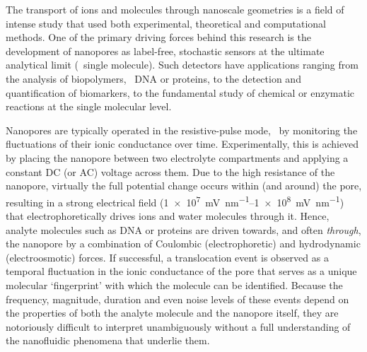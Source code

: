 \documentclass[journal=ancac3,manuscript=article,etalmode=truncate,maxauthors=0,layout=onecolumn]{achemso}
\begin{document}
The transport of ions and molecules through nanoscale geometries is a field of intense study that used both
experimental, theoretical and computational methods.\cite{Sparreboom-2010,Bocquet-2010,Maffeo-2012,
Thomas-2014,Wang-2014,Kim-2015} One of the primary driving forces behind this research is the development of
nanopores as label-free, stochastic sensors at the ultimate analytical limit (\ie{}~single molecule).
\cite{Bayley-2001,Dekker-2007,Venkatesan-2011,Zhang-2016} Such detectors have applications ranging from
the analysis of biopolymers,
\ie{}~DNA\cite{Deamer-2016,Kasianowicz-1996,Meller-2000,Maglia-2008,Butler-2008,Stoddart-2009,Franceschini-2013,Jain-2018}
or proteins,\cite{Restrepo-Perez-2018,Talaga-2009,Rodriguez-Larrea-2013, Nivala-2013,Kennedy-2016} to the
detection and quantification of
biomarkers,\cite{Chen-2013,Soskine-2012,Niedzwiecki-2013,VanMeervelt-2014,Huang-2017,Liu-2018,Galenkamp-2018}
to the fundamental study of chemical or enzymatic reactions at the single molecular
level.\cite{Willems-VanMeervelt-2017,Lieberman-2010, Nivala-2013,Ho-2015,Laszlo-2017}

Nanopores are typically operated in the resistive-pulse mode, \ie{}~by monitoring the fluctuations of their
ionic conductance over time.\cite{Bayley-2001,Dekker-2007,Maglia-2010,Venkatesan-2011} Experimentally, this is
achieved by placing the nanopore between two electrolyte compartments and applying a constant DC (or AC)
voltage across them. Due to the high resistance of the nanopore, virtually the full potential change occurs
within (and around) the pore, resulting in a strong electrical field (\SIrange{1e7}{1e8}{\mV\per\nm}) that
electrophoretically drives ions and water molecules through
it.\cite{Wong-2007,Mao-2014,Haywood-2014,Laohakunakorn-2015} Hence, analyte molecules such as DNA or proteins
are driven towards, and often \emph{through}, the nanopore by a combination of Coulombic (electrophoretic) and
hydrodynamic (electroosmotic) forces.\cite{Wong-2007,Grosberg-2010,Muthukumar-2010, Muthukumar-2014} If
successful, a translocation event is observed as a temporal fluctuation in the ionic conductance of the pore
that serves as a unique molecular `fingerprint' with which the molecule can be identified.\cite{Yusko-2017}
Because the frequency, magnitude, duration and even noise levels of these events depend on the properties of
both the analyte molecule and the nanopore itself, they are notoriously difficult to interpret unambiguously
without a full understanding of the nanofluidic phenomena that underlie them.
\end{document}
